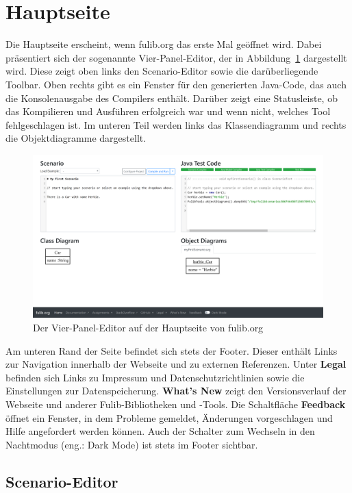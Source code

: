 \section{Hauptseite}\label{sec:main-page}

Die Hauptseite erscheint, wenn fulib.org das erste Mal geöffnet wird.
Dabei präsentiert sich der sogenannte Vier-Panel-Editor, der in Abbildung~\ref{fig:four-pane-editor} dargestellt wird.
Diese zeigt oben links den Scenario-Editor sowie die darüberliegende Toolbar.
Oben rechts gibt es ein Fenster für den generierten Java-Code, das auch die Konsolenausgabe des Compilers enthält.
Darüber zeigt eine Statusleiste, ob das Kompilieren und Ausführen erfolgreich war und wenn nicht, welches Tool fehlgeschlagen ist.
Im unteren Teil werden links das Klassendiagramm und rechts die Objektdiagramme dargestellt.

\begin{figure}
    \includegraphics[width=\textwidth]{chapter/fulib.org/img/four-pane-editor.png}
    \caption{Der Vier-Panel-Editor auf der Hauptseite von fulib.org}
    \label{fig:four-pane-editor}
\end{figure}

Am unteren Rand der Seite befindet sich stets der Footer.
Dieser enthält Links zur Navigation innerhalb der Webseite und zu externen Referenzen.
Unter \textbf{Legal} befinden sich Links zu Impressum und Datenschutzrichtlinien sowie die Einstellungen zur Datenspeicherung.
\textbf{What's New} zeigt den Versionsverlauf der Webseite und anderer Fulib-Bibliotheken und -Tools.
Die Schaltfläche \textbf{Feedback} öffnet ein Fenster, in dem Probleme gemeldet, Änderungen vorgeschlagen und Hilfe angefordert werden können.
Auch der Schalter zum Wechseln in den Nachtmodus (eng.: Dark Mode) ist stets im Footer sichtbar.

\subsection{Scenario-Editor}\label{subsec:scenario-editor}

